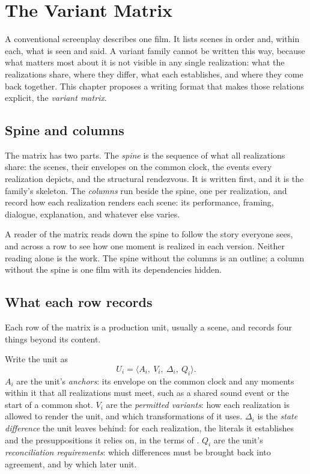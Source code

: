 \chapter{The Variant Matrix}\label{ch:matrix}

A conventional screenplay describes one film. It lists scenes in order and, within each, what is seen and said. A variant family cannot be written this way, because what matters most about it is not visible in any single realization: what the realizations share, where they differ, what each establishes, and where they come back together. This chapter proposes a writing format that makes those relations explicit, the \emph{variant matrix}.

\section{Spine and columns}

The matrix has two parts. The \emph{spine} is the sequence of what all realizations share: the scenes, their envelopes on the common clock, the events every realization depicts, and the structural rendezvous. It is written first, and it is the family's skeleton. The \emph{columns} run beside the spine, one per realization, and record how each realization renders each scene: its performance, framing, dialogue, explanation, and whatever else varies.

A reader of the matrix reads down the spine to follow the story everyone sees, and across a row to see how one moment is realized in each version. Neither reading alone is the work. The spine without the columns is an outline; a column without the spine is one film with its dependencies hidden.

\section{What each row records}

Each row of the matrix is a production unit, usually a scene, and records four things beyond its content.

Write the unit as
\begin{equation}
U_i=\langle A_i,\ V_i,\ \Delta_i,\ Q_i\rangle .
\end{equation}
$A_i$ are the unit's \emph{anchors}: its envelope on the common clock and any moments within it that all realizations must meet, such as a shared sound event or the start of a common shot. $V_i$ are the \emph{permitted variants}: how each realization is allowed to render the unit, and which transformations of  it uses. $\Delta_i$ is the \emph{state difference} the unit leaves behind: for each realization, the literals it establishes and the presuppositions it relies on, in the terms of . $Q_i$ are the unit's \emph{reconciliation requirements}: which differences must be brought back into agreement, and by which later unit.

